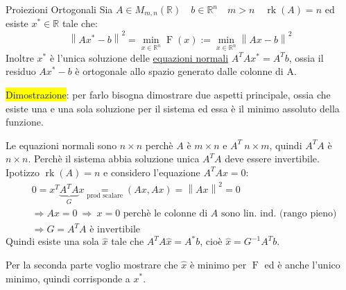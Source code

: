 \documentclass{article}
\begin{document}
\begin{theo}{Proiezioni Ortogonali}{}
    Sia $A\in M_{m,n}(\mathbb R)\quad b\in\mathbb R^n\quad m>n\quad \operatorname{rk}(A)=n$ ed esiste $x^\ast\in\mathbb R$ tale che:
    \[\left\|Ax^\ast-b\right\|^2=\min_{x\in\mathbb R^n}\operatorname{F}(x):=\min_{x\in\mathbb R^n}\left\|Ax-b\right\|^2\]
    Inoltre $x^\ast$ è l'unica soluzione delle \underline{equazioni normali} $A^TAx^\ast=A^Tb$, ossia il residuo
    $Ax^\ast-b$ è ortogonale allo spazio generato dalle colonne di A.
\end{theo}

\colorbox{yellow}{Dimostrazione}: per farlo bisogna dimostrare due aspetti principale, ossia che esiste una e una sola soluzione per il sistema ed essa è il minimo assoluto della funzione.

Le equazioni normali sono $n\times n$ perchè $A$ è $m\times n$ e $A^T\ n\times m$, quindi $A^TA$ è $n\times n$. Perchè il
sistema abbia soluzione unica $A^TA$ deve essere invertibile.\\
Ipotizzo $\operatorname{rk}(A)=n$ e considero l'equazione $A^TAx=0$:
\begin{align*}
     & 0=x^T\underbrace{A^TA}_Gx\underset{\text{prod scalare}}{=}\left(Ax,Ax\right)=\left\|Ax\right\|^2=0 \\
     & \Rightarrow Ax=0\ \Rightarrow\ x=0\text{ perchè le colonne di $A$ sono lin. ind. (rango pieno)}    \\
     & \Rightarrow G=A^TA\text{ è invertibile}
\end{align*}
Quindi esiste una sola $\widehat{x}$ tale che $A^TA\widehat{x}=A^\ast b$, cioè $\widehat{x}=G^{-1}A^Tb$.

Per la seconda parte voglio mostrare che $\widehat{x}$ è minimo per $\operatorname{F}$ ed è anche l'unico minimo, quindi corrisponde a $x^\ast$.
\end{document}
